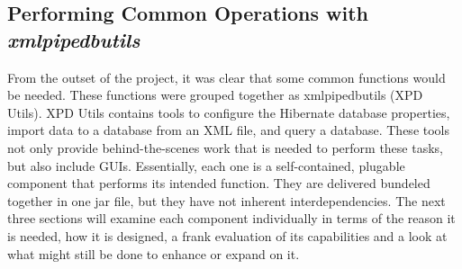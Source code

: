 \subsection{Performing Common Operations with \emph{xmlpipedbutils}}
From the outset of the project, it was clear that some common functions would be needed. These functions were grouped together as xmlpipedbutils (XPD Utils). XPD Utils contains tools to configure the Hibernate database properties, import data to a database from an XML file, and query a database. These tools not only provide behind-the-scenes work that is needed to perform these tasks, but also include GUIs. Essentially, each one is a self-contained, plugable component that performs its intended function. They are delivered bundeled together in one jar file, but they have not inherent interdependencies. The next three sections will examine each component individually in terms of the reason it is needed, how it is designed, a frank evaluation of its capabilities and a look at what might still be done to enhance or expand on it.